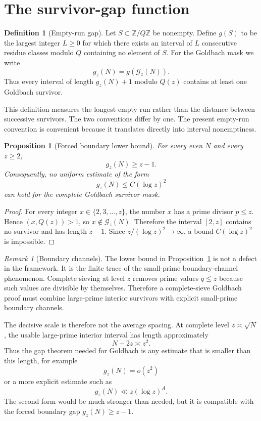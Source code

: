 \documentclass[11pt]{article}
\theoremstyle{plain}
\newtheorem{proposition}[theorem]{Proposition}
\theoremstyle{definition}
\newtheorem{definition}[theorem]{Definition}
\theoremstyle{remark}
\newtheorem{remark}[theorem]{Remark}
\newcommand{\Z}{\mathbb Z}
\newcommand{\G}{\mathcal G}
\begin{document}
\section{The survivor-gap function}
\label{sec:gap}

\begin{definition}[Empty-run gap]
Let \(S\subset\Z/Q\Z\) be nonempty.  Define \(g(S)\) to be the largest integer
\(L\ge0\) for which there exists an interval of \(L\) consecutive residue
classes modulo \(Q\) containing no element of \(S\).  For the Goldbach mask we
write
\[
g_z(N)=g(\G_z(N)).
\]
Thus every interval of length \(g_z(N)+1\) modulo \(Q(z)\) contains at least one
Goldbach survivor.
\end{definition}

This definition measures the longest empty run rather than the distance between
successive survivors.  The two conventions differ by one.  The present
empty-run convention is convenient because it translates directly into interval
nonemptiness.

\begin{proposition}[Forced boundary lower bound]
\label{prop:boundary_lower}
For every even \(N\) and every \(z\ge2\),
\[
g_z(N)\ge z-1.
\]
Consequently, no uniform estimate of the form
\[
g_z(N)\le C(\log z)^2
\]
can hold for the complete Goldbach survivor mask.
\end{proposition}

\begin{proof}
For every integer \(x\in\{2,3,\dots,z\}\), the number \(x\) has a prime divisor
\(p\le z\).  Hence \((x,Q(z))>1\), so \(x\notin\G_z(N)\).  Therefore the interval
\([2,z]\) contains no survivor and has length \(z-1\).  Since
\(z/(\log z)^2\to\infty\), a bound \(C(\log z)^2\) is impossible.
\end{proof}

\begin{remark}[Boundary channels]
The lower bound in Proposition~\ref{prop:boundary_lower} is not a defect in the
framework.  It is the finite trace of the small-prime boundary-channel
phenomenon.  Complete sieving at level \(z\) removes prime values \(q\le z\)
because such values are divisible by themselves.  Therefore a complete-sieve
Goldbach proof must combine large-prime interior survivors with explicit
small-prime boundary channels.
\end{remark}

The decisive scale is therefore not the average spacing.  At complete level
\(z\asymp\sqrt N\), the usable large-prime interior interval has length
approximately
\[
N-2z\asymp z^2.
\]
Thus the gap theorem needed for Goldbach is any estimate that is smaller than
this length, for example
\[
g_z(N)=o(z^2)
\]
or a more explicit estimate such as
\[
g_z(N)\ll z(\log z)^A.
\]
The second form would be much stronger than needed, but it is compatible with
the forced boundary gap \(g_z(N)\ge z-1\).
\end{document}
